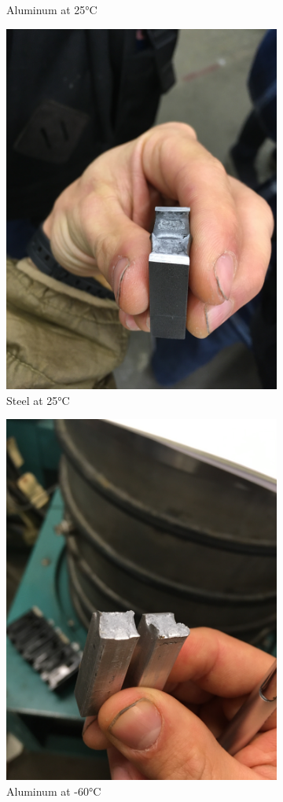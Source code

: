 \documentclass{article}
\begin{document}
\begin{enumerate}
\begin{figure}[H]
\begin{subfigure}{.5\textwidth}
\caption{Aluminum at \ang{25}C}
\end{subfigure}
\vspace{2em}
\hfill
\begin{subfigure}{.5\textwidth}
\centering
\includegraphics[width=.8\linewidth]{Fe25}
\caption{Steel at \ang{25}C}
\end{subfigure}
\hfill
\begin{subfigure}{.5\textwidth}
\centering
\includegraphics[width=.8\linewidth]{Al-60}
\caption{Aluminum at \ang{-60}C}
\end{subfigure}
\begin{subfigure}{.5\textwidth}
\centering


\end{subfigure}
\end{figure}
\end{enumerate}
\end{document}
